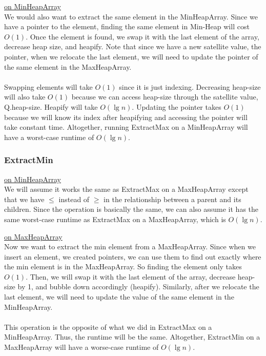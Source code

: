 \documentclass{article}
\begin{document}
\bigskip\noindent
\underline{on MinHeapArray}\\
We would also want to extract the same element in the MinHeapArray. Since we have a pointer to the element, finding the same element in Min-Heap will cost $O(1)$. Once the element is found, we swap it with the last element of the array, decrease heap size, and heapify. Note that since we have a new satellite value, the pointer, when we relocate the last element, we will need to update the pointer of the same element in the MaxHeapArray. \\~\\
Swapping elements will take $O(1)$ since it is just indexing. Decreasing heap-size will also take $O(1)$ because we can access heap-size through the satellite value, Q.heap-size. Heapify will take $O(\lg n)$. Updating the pointer takes $O(1)$ because we will know its index after heapifying and accessing the pointer will take constant time. Altogether, running ExtractMax on a MinHeapArray will have a worst-case runtime of $O(\lg n)$. 

\subsubsection*{ExtractMin}
\underline{on MinHeapArray}\\
\noindent
We will assume it works the same as ExtractMax on a MaxHeapArray except that we have $\leq $ instead of $\geq$ in the relationship between a parent and its children. Since the operation is basically the same, we can also assume it has the same worst-case runtime as ExtractMax on a MaxHeapArray, which is $O(\lg n)$.


\bigskip\noindent
\underline{on MaxHeapArray}\\
Now we want to extract the min element from a MaxHeapArray. Since when we insert an element, we created pointers, we can use them to find out exactly where the min element is in the MaxHeapArray. So finding the element only takes $O(1)$. Then, we will swap it with the last element of the array, decrease heap-size by 1, and bubble down accordingly (heapify). Similarly, after we relocate the last element, we will need to update the value of the same element in the MinHeapArray. \\~\\
This operation is the opposite of what we did in ExtractMax on a MinHeapArray. Thus, the runtime will be the same. Altogether, ExtractMin on a MaxHeapArray will have a worse-case runtime of $O(\lg n)$.  
\end{document}
